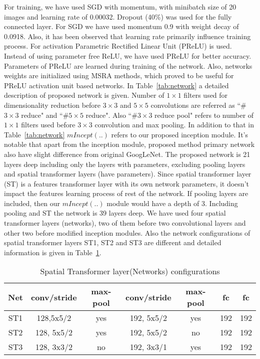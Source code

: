 \documentclass[conference]{IEEEtran}
\begin{document}
For training, we have used SGD with momentum, with minibatch size of 20 images and learning rate of 0.00032. Dropout (40\%) was used for the fully connected layer. For SGD we have used momentum 0.9 with weight decay of 0.0918. Also, it has been observed that learning rate primarily influence training process. For activation Parametric Rectified Linear Unit (PReLU) \cite{prelu} is used. Instead of using parameter free ReLU, we have used PReLU for better accuracy. Parameters of PReLU are learned during training of the network. Also, networks weights are initialized using MSRA \cite{prelu} methods, which proved to be useful for PReLU activation unit based networks.
In Table~\ref{tab:network} a detailed description of proposed network is given. Number of $ 1 \times 1$ filters used for dimensionality reduction before $ 3 \times 3$ and $ 5 \times 5$ convolutions are referred as ``\#$ 3\times 3$ reduce" and ``\#$ 5\times 5$ reduce". Also ``\#$ 3\times 3$ reduce pool" refers to number of $ 1 \times 1$ filters used before $ 3 \times 3$ convolution and max pooling. In addition to that in Table~\ref{tab:network} $mIncept(..) $ refers to our proposed inception module. It's notable that apart from the inception module, proposed method primary network also have slight difference from original GoogLeNet. The proposed network is 21 layers deep including only the layers with parameters, excluding pooling layers and spatial transformer layers (have parameters). Since spatial transformer layer (ST) is a features transformer layer with its own network parameters, it doesn't impact the features learning process of rest of the network. If pooling layers are included, then our $ mIncept(..)$ module would have a depth of 3. Including pooling and ST the network is 39 layers deep. We have used four spatial transformer layers (networks), two of them before two convolutional layers and other two before modified inception modules. Also the network configurations of spatial transformer layers ST1, ST2 and ST3 are different and detailed information is given in Table~\ref{tab:stn}.  




\begin{table}[h]
\caption{Spatial Transformer layer(Networks) configurations}
\label{tab:stn}
  \begin{center}
  \begin{tabular}{|c|c|c|c|c|c|c|}
\hline
Net & conv/stride & max-pool & conv/stride & max-pool & fc & fc \\
\hline
ST1 & 128,5x5/2 & yes & 192, 5x5/2 & yes & 192 & 192 \\
\hline
ST2 & 128, 5x5/2 & yes & 192, 5x5/2 & no & 192 & 192 \\
\hline
ST3 & 128, 3x3/2 & no & 192, 3x3/1 & yes & 192 & 192 \\
\hline
 \end{tabular}
 \end{center}
\end{table}
\end{document}
